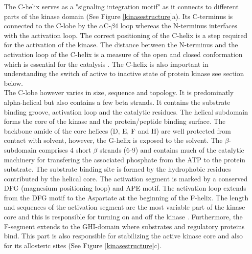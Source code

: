 \documentclass[a4paper, 11pt]{article}
\begin{document}
The C-helix serves as a "signaling integration motif" as it connects to different parts of the kinase domain (See Figure \ref{kinasestructure}a). Its C-terminus is connected to the C-lobe by the $\alpha$C-$\beta$4 loop whereas the N-terminus interfaces with the activation loop. The correct positioning of the C-helix is a step required for the activation of the kinase. The distance between the N-terminus and the activation loop of the C-helix is a measure of the open and closed conformation which is essential for the catalysis \cite{taylor2011protein}. The C-helix is also important in understanding the switch of active to inactive state of protein kinase see section below.\\

The C-lobe however varies in size, sequence and topology. It is predominatly alpha-helical but also contains a few beta strands. It contains the substrate binding groove, activation loop and the catalytic residues. The helical subdomain forms the core of the kinase and the protein/peptide binding surface. The backbone amide of the core helices (D, E, F and H) are well protected from contact with solvent, however, the G-helix is exposed to the solvent. The $\beta$-subdomain comprises 4 short $\beta$ strands (6-9) and contains much of the catalytic machinery for transfering the associated phosphate from the ATP to the protein substrate. The substrate binding site is formed by the hydrophobic residues contributed by the helical core. The activation segment is marked by a conserved DFG (magnesium positioning loop) and APE motif. The activation loop extends from the DFG motif to the Aspartate at the beginning of the F-helix. The length and sequences of the activation segment are the most variable part of the kinase core and this is responsible for turning on and off the kinase \cite{taylor2011protein}. Furthermore, the F-segment extends to the GHI-domain where substrates and regulatory proteins bind. This part is also responsible for stabilizing the active kinase core and also for its allosteric sites (See Figure \ref{kinasestructure}c).\\
\end{document}
